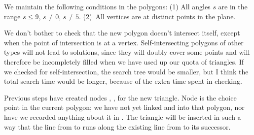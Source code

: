 We maintain the following conditions in the polygons: (1) All angles
$s$ are in the range $s\le 9$, $s\ne0$, $s\ne5$. (2)~All vertices are at
distinct points in the plane.

We don't bother to check that the new polygon doesn't intersect itself,
except when the point of intersection is at a vertex. Self-intersecting
polygons of other types  will not lead to solutions,
since they will doubly cover some
points and will therefore be incompletely filled when we have used up
our quota of triangles. If we checked for self-intersection, the search
tree would be smaller, but I think the total search time would be
longer, because of the extra time spent in checking.

Previous steps have created nodes , ,  for the
new
triangle. Node  is the choice point in the current polygon; we have
not
yet linked  and  into that polygon, nor have we recorded
anything about it in . The triangle will be inserted in
such
a way that the line from  to  runs along the existing
line
from  to its successor.

